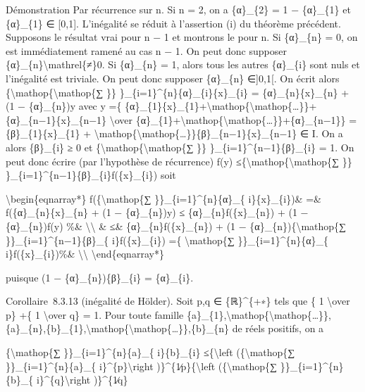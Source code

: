 \documentclass[]{article}
\begin{document}
Démonstration Par récurrence sur n. Si n = 2, on a \{α\}\_\{2\} = 1 −
\{α\}\_\{1\} et \{α\}\_\{1\} ∈ {[}0,1{]}. L'inégalité se réduit à
l'assertion (i) du théorème précédent. Supposons le résultat vrai pour n
− 1 et montrons le pour n. Si \{α\}\_\{n\} = 0, on est immédiatement
ramené au cas n − 1. On peut donc supposer
\{α\}\_\{n\}\textbackslash{}mathrel\{≠\}0. Si \{α\}\_\{n\} = 1, alors
tous les autres \{α\}\_\{i\} sont nuls et l'inégalité est triviale. On
peut donc supposer \{α\}\_\{n\} ∈{]}0,1{[}. On écrit alors
\{\textbackslash{}mathop\{\textbackslash{}mathop\{∑ \}\}
\}\_\{i=1\}\^{}\{n\}\{α\}\_\{i\}\{x\}\_\{i\} = \{α\}\_\{n\}\{x\}\_\{n\}
+ (1 − \{α\}\_\{n\})y avec y =\{
\{α\}\_\{1\}\{x\}\_\{1\}+\textbackslash{}mathop\{\textbackslash{}mathop\{\ldots{}\}\}+\{α\}\_\{n−1\}\{x\}\_\{n−1\}
\textbackslash{}over
\{α\}\_\{1\}+\textbackslash{}mathop\{\textbackslash{}mathop\{\ldots{}\}\}+\{α\}\_\{n−1\}\}
= \{β\}\_\{1\}\{x\}\_\{1\} +
\textbackslash{}mathop\{\textbackslash{}mathop\{\ldots{}\}\}\{β\}\_\{n−1\}\{x\}\_\{n−1\}
∈ I. On a alors \{β\}\_\{i\} ≥ 0 et
\{\textbackslash{}mathop\{\textbackslash{}mathop\{∑ \}\}
\}\_\{i=1\}\^{}\{n−1\}\{β\}\_\{i\} = 1. On peut donc écrire (par
l'hypothèse de récurrence) f(y)
≤\{\textbackslash{}mathop\{\textbackslash{}mathop\{∑ \}\}
\}\_\{i=1\}\^{}\{n−1\}\{β\}\_\{i\}f(\{x\}\_\{i\}) soit

\textbackslash{}begin\{eqnarray*\} f(\{\textbackslash{}mathop\{∑
\}\}\_\{i=1\}\^{}\{n\}\{α\}\_\{ i\}\{x\}\_\{i\})\& =\&
f(\{α\}\_\{n\}\{x\}\_\{n\} + (1 − \{α\}\_\{n\})y) ≤
\{α\}\_\{n\}f(\{x\}\_\{n\}) + (1 − \{α\}\_\{n\})f(y) \%\&
\textbackslash{}\textbackslash{} \& ≤\& \{α\}\_\{n\}f(\{x\}\_\{n\}) + (1
− \{α\}\_\{n\})\{\textbackslash{}mathop\{∑
\}\}\_\{i=1\}\^{}\{n−1\}\{β\}\_\{ i\}f(\{x\}\_\{i\}) =\{
\textbackslash{}mathop\{∑ \}\}\_\{i=1\}\^{}\{n\}\{α\}\_\{
i\}f(\{x\}\_\{i\})\%\& \textbackslash{}\textbackslash{}
\textbackslash{}end\{eqnarray*\}

puisque (1 − \{α\}\_\{n\})\{β\}\_\{i\} = \{α\}\_\{i\}.

Corollaire~8.3.13 (inégalité de Hölder). Soit p,q ∈ \{ℝ\}\^{}\{+∗\} tels
que \{ 1 \textbackslash{}over p\} +\{ 1 \textbackslash{}over q\} = 1.
Pour toute famille
\{a\}\_\{1\},\textbackslash{}mathop\{\textbackslash{}mathop\{\ldots{}\}\},\{a\}\_\{n\},\{b\}\_\{1\},\textbackslash{}mathop\{\textbackslash{}mathop\{\ldots{}\}\},\{b\}\_\{n\}
de réels positifs, on a

\{\textbackslash{}mathop\{∑ \}\}\_\{i=1\}\^{}\{n\}\{a\}\_\{
i\}\{b\}\_\{i\} ≤\{\textbackslash{}left (\{\textbackslash{}mathop\{∑
\}\}\_\{i=1\}\^{}\{n\}\{a\}\_\{ i\}\^{}\{p\}\textbackslash{}right
)\}\^{}\{1∕p\}\{\textbackslash{}left (\{\textbackslash{}mathop\{∑
\}\}\_\{i=1\}\^{}\{n\}\{b\}\_\{ i\}\^{}\{q\}\textbackslash{}right
)\}\^{}\{1∕q\}
\end{document}
